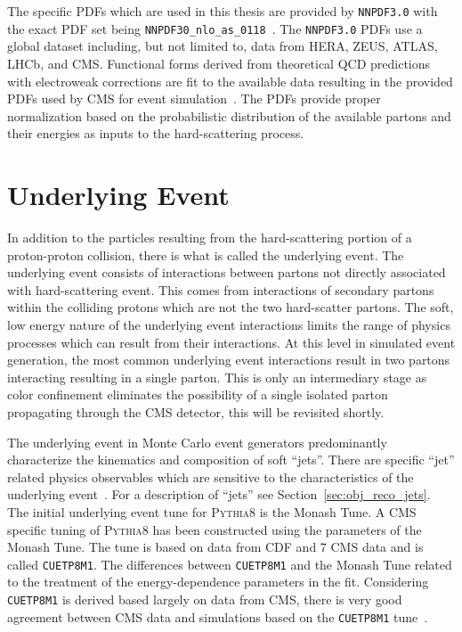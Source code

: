 The specific PDFs which are used in this thesis
 are provided by \texttt{NNPDF3.0} with the exact PDF set being 
\texttt{NNPDF30\_nlo\_as\_0118}~\cite{Ball:2014uwa, Ball:2011uy}. The \texttt{NNPDF3.0} PDFs
use a global dataset including, but not limited to, data from HERA, ZEUS, ATLAS, LHCb, and CMS.
Functional forms derived from theoretical QCD predictions with electroweak corrections are fit
to the available data resulting in the provided PDFs used by CMS for event simulation~\cite{Ball:2014uwa}.
The PDFs provide proper normalization based on the probabilistic distribution of the 
available partons and their energies as inputs to the hard-scattering process.



\section{Underlying Event}
In addition to the particles resulting from the hard-scattering portion of a proton-proton collision,
there is what is called the underlying event. The underlying event consists of interactions between
partons not directly associated with hard-scattering event. This comes from interactions of 
secondary partons within the colliding protons which are not the two hard-scatter partons.
The soft, low energy nature of the underlying event interactions limits the range of physics
processes which can result from their interactions. At this level in simulated event generation,
the most common underlying event interactions result in two partons interacting resulting in a 
single parton. This is only an intermediary stage as color confinement eliminates the possibility
of a single isolated parton propagating through the CMS detector, this will be revisited shortly.

The underlying event in 
Monte Carlo event generators predominantly characterize the kinematics and composition of soft ``jets''.
There are specific ``jet'' related physics observables which are sensitive to the characteristics of the underlying
event~\cite{Khachatryan:2015pea, Field:cdf2008}. For a description of ``jets'' see Section~\ref{sec:obj_reco_jets}.
The initial underlying event tune for \textsc{Pythia8} is the Monash Tune. A CMS specific tuning of 
\textsc{Pythia8} has been constructed using the parameters of the Monash Tune. The tune is based
on data from CDF and 7 \TeV CMS data and is called \texttt{CUETP8M1}. The differences between
\texttt{CUETP8M1} and the Monash Tune related to the treatment of the energy-dependence 
parameters in the fit. Considering \texttt{CUETP8M1} is derived based largely on data from
CMS, there is very good agreement between CMS data and simulations based on the
\texttt{CUETP8M1} tune~\cite{Khachatryan:2015pea}. 



